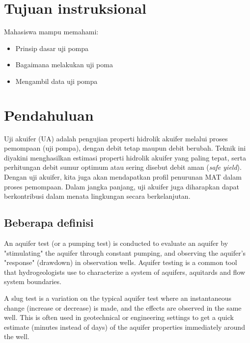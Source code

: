 \section{Tujuan instruksional} 

Mahasiswa mampu memahami:
\begin{itemize}
\item Prinsip dasar uji pompa
\end{itemize}
\begin{itemize}
\item Bagaimana melakukan uji poma
\end{itemize}
\begin{itemize}
\item Mengambil data uji pompa
\end{itemize}


\section{Pendahuluan}

Uji akuifer (UA) adalah pengujian properti hidrolik akuifer melalui proses pemompaan (uji pompa), dengan debit tetap maupun debit berubah. Teknik ini diyakini menghasilkan estimasi properti hidrolik akuifer yang paling tepat, serta perhitungan debit sumur optimum atau sering disebut debit aman (\textit{safe yield}). Dengan uji akuifer, kita juga akan mendapatkan profil penurunan MAT dalam proses pemompaan. Dalam jangka panjang, uji akuifer juga diharapkan dapat berkontribusi dalam menata lingkungan secara berkelanjutan.


\subsection{Beberapa definisi}

An aquifer test (or a pumping test) is conducted to evaluate an aquifer by "stimulating" the aquifer through constant pumping, and observing the aquifer's "response" (drawdown) in observation wells. Aquifer testing is a common tool that hydrogeologists use to characterize a system of aquifers, aquitards and flow system boundaries.

A slug test is a variation on the typical aquifer test where an instantaneous change (increase or decrease) is made, and the effects are observed in the same well. This is often used in geotechnical or engineering settings to get a quick estimate (minutes instead of days) of the aquifer properties immediately around the well.

